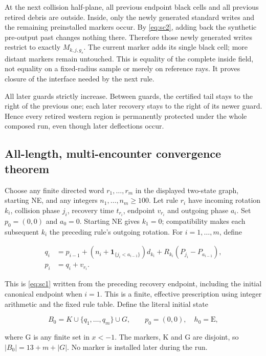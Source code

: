 At the next collision half-plane, all previous endpoint black cells and
all previous retired debris are outside. Inside, only the newly
generated standard writes and the remaining preinstalled markers occur.
By \eqref{eq:sc2}, adding back the synthetic pre-output past changes nothing there.
Therefore those newly generated writes restrict to exactly
$M_{k,j,g_s}$. The current marker adds its single black cell; more
distant markers remain untouched. This is equality of the complete
inside field, not equality on a fixed-radius sample or merely on
reference rays. It proves closure of the interface needed by the next
rule.

All later guards strictly increase. Between guards, the certified tail
stays to the right of the previous one; each later recovery stays to the
right of its newer guard. Hence every retired western region is
permanently protected under the whole composed run, even though later
deflections occur.

\subsection{All-length, multi-encounter convergence
theorem}\label{scattering-5}

Choose any finite directed word $r_1,\ldots,r_m$ in the displayed
two-state graph, starting NE, and any integers
$n_1,\ldots,n_m\ge100$. Let rule $r_i$ have incoming rotation $k_i$,
collision phase $j_i$, recovery time $t_{r_i}$, endpoint $v_{r_i}$ and
outgoing phase $a_i$. Set $p_0=(0,0)$ and $a_0=0$. Starting NE gives
$k_1=0$; compatibility makes each subsequent $k_i$ the preceding rule's
outgoing rotation. For $i=1,\ldots,m$, define

\[
\begin{aligned}
q_i&=p_{i-1}+(n_i+\mathbf1_{\{j_i<a_{i-1}\}})d_{k_i}
       +R_{k_i}(P_{j_i}-P_{a_{i-1}}),\\
p_i&=q_i+v_{r_i}.
\end{aligned}
\]

This is \eqref{eq:sc1} written from the preceding recovery endpoint,
including the initial canonical endpoint when $i=1$. This is a finite, effective prescription using integer
arithmetic and the fixed rule table. Define the literal initial state

\[
B_0=K\cup\{q_1,\ldots,q_m\}\cup G,\qquad p_0=(0,0),\quad h_0=\mathrm E,
\]

where G is any finite set in $x<-1$. The markers, K and G are
disjoint, so $|B_0|=13+m+|G|$. No marker is
installed later during the run.

